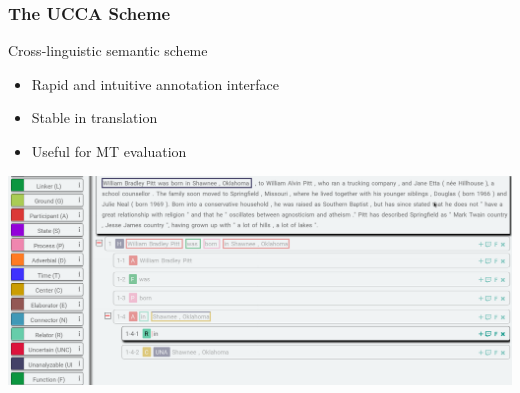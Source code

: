 \documentclass[t]{beamer}
\begin{document}
\begin{frame}
\frametitle{The UCCA Scheme}
Cross-linguistic semantic scheme \cite{abend2013universal}
\begin{itemize}
\item Rapid and intuitive annotation interface \cite{abend2017uccaapp}
\item Stable in translation \cite{sulem2015conceptual}
\item Useful for MT evaluation \cite{birch2016hume}
\end{itemize}
\vfill
\begin{center}
  \includegraphics[width=\linewidth]{uccaapp.png}
\end{center}
\end{frame}
\end{document}
